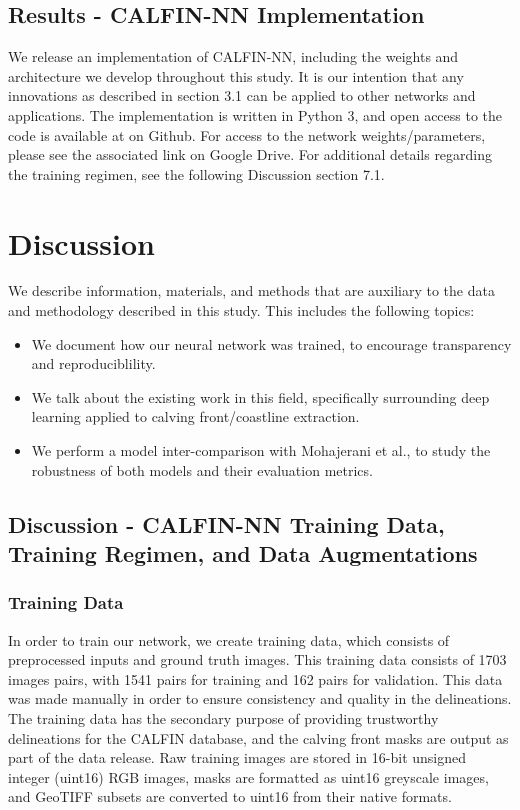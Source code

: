 \documentclass[tc, manuscript]{copernicus}
\begin{document}
\subsection{Results - CALFIN-NN Implementation}
We release an implementation of CALFIN-NN, including the weights and architecture we develop throughout this study. It is our intention that any innovations as described in section 3.1 can be applied to other networks and applications. The implementation is written in Python 3, and open access to the code is available at on Github. For access to the network weights/parameters, please see the associated link on Google Drive. For additional details regarding the training regimen, see the following Discussion section 7.1.


\section{Discussion}
We describe information, materials, and methods that are auxiliary to the data and methodology described in this study. This includes the following topics:
\begin{itemize}
    \item We document how our neural network was trained, to encourage transparency and reproduciblility.
    \item We talk about the existing work in this field, specifically surrounding deep learning applied to calving front/coastline extraction.
    \item We perform a model inter-comparison with Mohajerani et al., to study the robustness of both models and their evaluation metrics.
\end{itemize}

\subsection{Discussion - CALFIN-NN Training Data, Training Regimen, and Data Augmentations}

\subsubsection{Training Data}
In order to train our network, we create training data, which consists of preprocessed inputs and ground truth images. This training data consists of 1703 images pairs, with 1541 pairs for training and 162 pairs for validation. This data was made manually in order to ensure consistency and quality in the delineations. The training data has the secondary purpose of providing trustworthy delineations for the CALFIN database, and the calving front masks are output as part of the data release. Raw training images are stored in 16-bit unsigned integer (uint16) RGB images, masks are formatted as uint16 greyscale images, and GeoTIFF subsets are converted to uint16 from their native formats.
\end{document}
